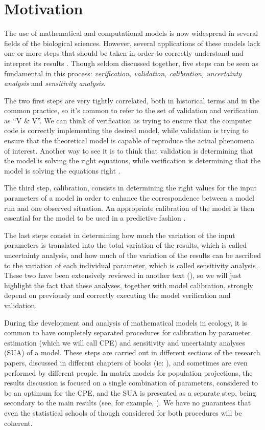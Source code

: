 \documentclass[twoside,12pt,a4paper]{article}
\begin{document}
\section{Motivation}

The use of mathematical and computational models is now widespread in several fields of the biological 
sciences. However, several applications of these models lack one or more steps that should be taken in
order to correctly understand and interpret its results \citep{Bart95}. Though seldom discussed together,
five steps can be seen as fundamental in this process: {\em verification, validation, calibration, 
uncertainty analysis} and {\em sensitivity analysis}. 

The two first steps are very tightly correlated, both in historical terms and in the common practice,
so it's common to refer to the set of validation and verification as ``V \& V''. We can think of verification
as trying to ensure that the computer code is correctly implementing the desired model, while validation
is trying to ensure that the theoretical model is capable of reproduce the actual phenomena of interest.
Another way to see it is to think that validation is determining that the model is solving the right 
equations, while verification is determining that the model is solving the equations right \citep{ASC2010}.

The third step, calibration, consists in determining the right values for the input parameters of a model
in order to enhance the correspondence between a model run and one observed situation. An appropriate
calibration of the model is then essential for the model to be used in a predictive fashion \citep{ASC2010}.

The last steps consist in determining how much the variation of the input parameters is translated into
the total variation of the results, which is called uncertainty analysis, and how much of the variation
of the results can be ascribed to the variation of each individual parameter, which is called sensitivity
analysis \citep{Helton03, Helton05}. These two have been extensively reviewed in another text 
(\citep{Chalom12}), so we will just highlight the fact that these analyses, together with model calibration,
strongly depend on previously and correctly executing the model verification and validation.

During the development and analysis of mathematical models in ecology, it is common to have completely 
separated procedures for calibration by parameter estimation (which we will call CPE) and 
sensitivity and uncertainty analyses (SUA) of a model. These steps are carried out in different sections of
the research papers, discussed in different chapters of books (ie: \citep{Caswell89}), and sometimes are
even performed by different people. In matrix models for population projections, the results discussion
is focused on a single combination of parameters, considered to be an optimum for the CPE, and the
SUA is presented as a separate step, being secondary to the main results (see, for example, 
\citep{SilvaMatos99}). We have no guarantees that even the statistical schools of though considered for 
both procedures will be coherent.
\end{document}
